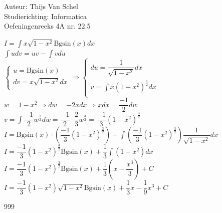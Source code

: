 \documentclass[a4paper]{article}
\newcommand{\Bgsin}{\text{Bgsin}}
\newcommand{\dint}{\displaystyle\int}
\begin{document}
  
\noindent \large Auteur: Thijs Van Schel\\
\noindent \large Studierichting: Informatica\\
\noindent \large Oefeningenreeks 4A nr. 22.5 \\

\medskip

\normalsize

$I = \dint x\sqrt{1-x^2}\Bgsin(x)dx$\\

$\dint u dv = uv - \dint v du$\\

$\left\{
    \begin{array}{l}
        u = \Bgsin(x)\\
        dv = x\sqrt{1-x^2}dx\\
    \end{array}
\right. \Rightarrow \left\{
    \begin{array}{l}
        du = \dfrac{1}{\sqrt{1-x^2}}dx\\
        v = \dint x(1-x^2)^{\tfrac{1}{2}}dx\\
    \end{array}
\right.$\\

$w = 1-x^2 \Rightarrow dw = -2xdx \Rightarrow xdx = \dfrac{-1}{2}dw$\\

$v = \dint \dfrac{-1}{2} w^{\tfrac{1}{2}} dw = \dfrac{-1}{2} \cdot \dfrac{2}{3} w^{\tfrac{3}{2}} = \dfrac{-1}{3}(1-x^2)^{\tfrac{3}{2}}$\\

$I = \Bgsin(x) \cdot \left(\dfrac{-1}{3}(1-x^2)^{\tfrac{3}{2}}\right) - \dint \left(\dfrac{-1}{3}(1-x^2)^{\tfrac{3}{2}}\right) \dfrac{1}{\sqrt{1-x^2}}dx$\\

$I = \dfrac{-1}{3}(1-x^2)^{\tfrac{3}{2}}\Bgsin(x) + \dfrac{1}{3} \dint (1-x^2)dx$\\

$I = \dfrac{-1}{3}(1-x^2)^{\tfrac{3}{2}}\Bgsin(x) + \dfrac{1}{3} \left(x - \dfrac{x^3}{3}\right) + C$\\

$I = \dfrac{-1}{3}(1-x^2)\sqrt{1-x^2}\Bgsin(x) + \dfrac{1}{3}x - \dfrac{1}{9}x^3 + C$\\

\begin{thebibliography}{999}
\end{thebibliography}
\end{document}
